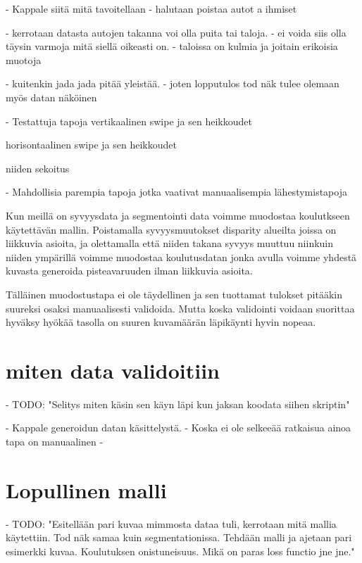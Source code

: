 - Kappale siitä mitä tavoitellaan
    - halutaan poistaa autot a ihmiset

- kerrotaan datasta autojen takanna voi olla puita tai taloja. 
 - ei voida siis olla täysin varmoja mitä siellä oikeasti on. 
  - taloissa on kulmia ja joitain erikoisia muotoja

- kuitenkin jada jada pitää yleistää.
- joten lopputulos tod näk tulee olemaan myös datan näköinen

- Testattuja tapoja 
vertikaalinen swipe ja sen heikkoudet

horisontaalinen swipe ja sen heikkoudet

niiden sekoitus

- Mahdollisia parempia tapoja jotka vaativat manuaalisempia lähestymistapoja



Kun meillä on syvyysdata ja segmentointi data voimme muodostaa koulutkseen käytettävän mallin.
Poistamalla syvyysmuutokset disparity alueilta joissa on liikkuvia asioita, ja olettamalla että niiden takana syvyys muuttuu niinkuin niiden ympärillä voimme muodostaa koulutusdatan jonka avulla voimme yhdestä kuvasta generoida pisteavaruuden ilman liikkuvia asioita.

Tälläinen muodostustapa ei ole täydellinen ja sen tuottamat tulokset pitääkin suureksi osaksi manuaalisesti validoida.
Mutta koska validointi voidaan suorittaa hyväksy hyökää tasolla on suuren kuvamäärän läpikäynti hyvin nopeaa.

\section{miten data validoitiin}

- TODO: "Selitys miten käsin sen käyn läpi kun jaksan koodata siihen skriptin"

- Kappale generoidun datan käsittelystä. 
- Koska ei ole selkeeää ratkaisua ainoa tapa on manuaalinen
- 


\section{Lopullinen malli}

- TODO: "Esitellään pari kuvaa mimmosta dataa tuli, kerrotaan mitä mallia käytettiin. Tod näk samaa kuin segmentationissa. Tehdään malli ja ajetaan pari esimerkki kuvaa. Koulutuksen onistuneisuus. Mikä on paras loss functio jne jne."
 

